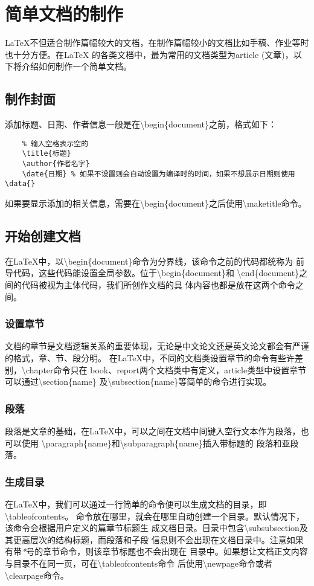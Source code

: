\section{简单文档的制作}
LaTeX不但适合制作篇幅较大的文档，在制作篇幅较小的文档比如手稿、作业等时也十分方便。在LaTeX
的各类文档中，最为常用的文档类型为article (文章)，以下将介绍如何制作一个简单文档。

\subsection{制作封面}
添加标题、日期、作者信息一般是在\textbackslash begin\{document\}之前，格式如下：
\begin{lstlisting}
    % 输入空格表示空的
    \title{标题}
    \author{作者名字}
    \date{日期} % 如果不设置则会自动设置为编译时的时间，如果不想展示日期则使用\data{}
\end{lstlisting}

如果要显示添加的相关信息，需要在\textbackslash begin\{document\}之后使用\textbackslash maketitle命令。

\subsection{开始创建文档}
在LaTeX中，以\textbackslash begin\{document\}命令为分界线，该命令之前的代码都统称为
前导代码，这些代码能设置全局参数。位于\textbackslash begin\{document\}和
\textbackslash end\{document\}之间的代码被视为主体代码，我们所创作文档的具
体内容也都是放在这两个命令之间。

\subsubsection{设置章节}
文档的章节是文档逻辑关系的重要体现，无论是中文论文还是英文论文都会有严谨的格式，章、节、段分明。
在LaTeX中，不同的文档类设置章节的命令有些许差别，\textbackslash chapter命令只在
book、report两个文档类中有定义，article类型中设置章节可以通过\textbackslash section\{name\}
及\textbackslash subsection\{name\}等简单的命令进行实现。

\subsubsection{段落}
段落是文章的基础，在LaTeX中，可以之间在文档中间键入空行文本作为段落，也可以使用
\textbackslash paragraph\{name\}和\textbackslash subparagraph\{name\}插入带标题的
段落和亚段落。

\subsubsection{生成目录}
在LaTeX中，我们可以通过一行简单的命令便可以生成文档的目录，即\textbackslash tableofcontents。
命令放在哪里，就会在哪里自动创建一个目录。默认情况下，该命令会根据用户定义的篇章节标题生
成文档目录。目录中包含\textbackslash subsubsection及其更高层次的结构标题，而段落和子段
信息则不会出现在文档目录中。注意如果有带\emph{*}号的章节命令，则该章节标题也不会出现在
目录中。如果想让文档正文内容与目录不在同一页，可在\textbackslash tableofcontents命令
后使用\textbackslash newpage命令或者\textbackslash clearpage命令。

